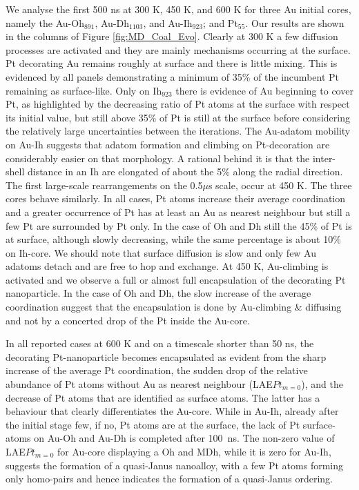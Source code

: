 We analyse the first 500 ns at 300 K, 450 K, and 600 K for three Au initial cores, namely the Au-Oh$_{891}$, Au-Dh$_{1103}$, and Au-Ih$_{923}$; and Pt$_{55}$. Our results are shown in the columns of Figure \ref{fig:MD_Coal_Evo}. Clearly at 300 K a few diffusion processes are activated and they are mainly mechanisms occurring at the surface. Pt decorating Au remains roughly at surface and there is little mixing. This is evidenced by all panels demonstrating a minimum of 35\% of the incumbent Pt remaining as surface-like. Only on Ih$_{923}$ there is evidence of Au beginning to cover Pt, as highlighted by the decreasing ratio of Pt atoms at the surface with respect its initial value, but still above 35\% of Pt is still at the surface before considering the relatively large uncertainties between the iterations. The Au-adatom mobility on Au-Ih suggests that adatom formation and climbing on Pt-decoration are considerably easier on that morphology. A rational behind it is that the inter-shell distance in an Ih are elongated of about the 5\% along the radial direction. 
The first large-scale rearrangements on the 0.5$\mu$s scale, occur at 450 K. The three cores behave similarly. In all cases, Pt atoms increase their average coordination and a greater occurrence of Pt has at least an Au as nearest neighbour but still a few Pt are  surrounded by Pt only.  In the case of Oh and Dh still the 45\% of Pt is at surface, although slowly decreasing, while the same percentage is about 10\% on Ih-core. 
%
We should note that surface diffusion is slow and only few Au adatoms detach and are free to hop and exchange. At 450 K, Au-climbing is activated and we observe a full or almost full encapsulation of the decorating Pt nanoparticle. In the case of Oh and Dh, the slow increase of the average coordination suggest that the encapsulation is done by Au-climbing \& diffusing and not by a concerted drop of the Pt inside the Au-core.

In all reported cases at 600 K and on a timescale shorter than 50 ns, the decorating Pt-nanoparticle becomes encapsulated as evident from the sharp increase of the average Pt coordination, the sudden drop of the relative abundance of Pt atoms without Au as nearest neighbour (LAE${Pt}_{m=0}$), and the decrease of Pt atoms that are identified as surface atoms. The latter has a behaviour that clearly differentiates the Au-core. While in Au-Ih, already after the initial stage few, if no, Pt atoms are at the surface, the lack of Pt surface-atoms on Au-Oh and Au-Dh is completed after 100~ns. 
The non-zero value of LAE${Pt}_{m=0}$ for Au-core displaying a Oh and MDh, while it is zero for Au-Ih, suggests the formation of a quasi-Janus nanoalloy, with a few Pt atoms forming only homo-pairs and hence indicates the formation of a quasi-Janus ordering.


